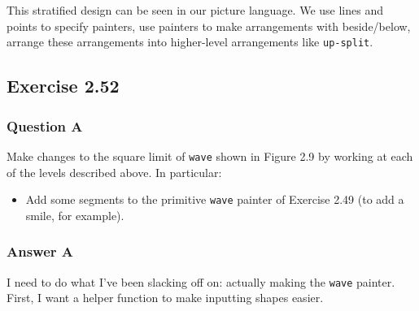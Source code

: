 \documentclass[final,fleqn,titlepage,twoside]{article}
\begin{document}
This stratified design can be seen in our picture language. We use lines and
points to specify painters, use painters to make arrangements with beside/below,
arrange these arrangements into higher-level arrangements like
\texttt{up-split}.

\subsection{Exercise 2.52}
\label{sec:org72bb53b}
\subsubsection{Question A}
\label{sec:org143bc16}
Make changes to the square limit of \texttt{wave} shown in Figure 2.9 by
working at each of the levels described above. In particular:

\begin{itemize}
\item Add some segments to the primitive \texttt{wave} painter of Exercise 2.49 (to add a smile, for example).
\end{itemize}

\subsubsection{Answer A}
\label{sec:org04ec683}
I need to do what I've been slacking off on: actually making the \texttt{wave} painter.
First, I want a helper function to make inputting shapes easier.
\end{document}
